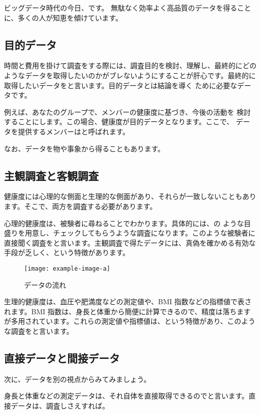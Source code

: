 ビッグデータ時代の今日、です。 無駄なく効率よく高品質のデータを得ることに、多くの人が知恵を傾けています。

\subsection{目的データ}
時間と費用を掛けて調査をする際には、調査目的を検討、理解し、最終的にどのようなデータを取得したいのかがブレないようにすることが肝心です。最終的に取得したいデータをと言います。目的データとは結論を導く ために必要なデータです。 

例えば、あなたのグループで、メンバーの健康度に基づき、今後の活動を 検討することにします。この場合、健康度が目的データとなります。ここで、 データを提供するメンバーはと呼ばれます。

なお、データを物や事象から得ることもあります。

\subsection{主観調査と客観調査}
 健康度には心理的な側面と生理的な側面があり、それらが一致しないこともあります。そこで、両方を調査する必要があります。
 
 心理的健康度は、被験者に尋ねることでわかります。具体的には、{}の ような目盛りを用意し、チェックしてもらうような調査になります。このような被験者に直接聞く調査をと言います。主観調査で得たデータには、真偽を確かめる有効な手段が乏しく、という特徴があります。
 
\begin{figure}[h]
     \centering
     \texttt{[image: example-image-a]}
     \caption{データの流れ\label{fig:invs}}
 \end{figure}

生理的健康度は、血圧や肥満度などの測定値や、BMI 指数などの指標値で表されます。BMI 指数は、身長と体重から簡便に計算できるので、精度は落ちますが多用されています。これらの測定値や指標値は、という特徴があり、このような調査をと言います。

\subsection{直接データと間接データ}
次に、データを別の視点からみてみましょう。

身長と体重などの測定データは、それ自体を直接取得できるのでと言います。直接データは、調査しさえすれば。

